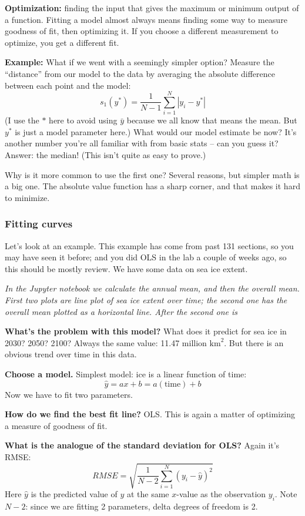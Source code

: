 \documentclass{article}
\begin{document}
\textbf{Optimization:} finding the input that gives the maximum or minimum output of a function. Fitting a model almost always means finding some way to measure goodness of fit, then optimizing it. If you choose a different measurement to optimize, you get a different fit.

\textbf{Example:} What if we went with a seemingly simpler option? Measure the ``distance'' from our model to the data by averaging the absolute difference between each point and the model:
\[
    s_1(y^*) = \frac{1}{N - 1} \sum_{i = 1}^N |y_i - y^*|
\]
(I use the $*$ here to avoid using $\bar y$ because we all know that means the mean. But $y^*$ is just a model parameter here.) What would our model estimate be now? It's another number you're all familiar with from basic stats -- can you guess it? Answer: the median! (This isn't quite as easy to prove.)

Why is it more common to use the first one? Several reasons, but simpler math is a big one. The absolute value function has a sharp corner, and that makes it hard to minimize.

\subsubsection{Fitting curves}

Let's look at an example. This example has come from past 131 sections, so you may have seen it before; and you did OLS in the lab a couple of weeks ago, so this should be mostly review. We have some data on sea ice extent.

\textit{In the Jupyter notebook we calculate the annual mean, and then the overall mean. First two plots are line plot of sea ice extent over time; the second one has the overall mean plotted as a horizontal line. After the second one is }

\textbf{What's the problem with this model?} What does it predict for sea ice in 2030? 2050? 2100? Always the same value: 11.47 million $\mathrm{km}^2$. But there is an obvious trend over time in this data.

\textbf{Choose a model.} Simplest model: ice is a linear function of time:
\[
\hat y = ax + b = a(\mathrm{time}) + b
\]
Now we have to fit two parameters.

\textbf{How do we find the best fit line?} OLS. This is again a matter of optimizing a measure of goodness of fit.

\textbf{What is the analogue of the standard deviation for OLS?} Again it's RMSE:
\[
    RMSE = \sqrt{\frac{1}{N-2} \sum_{i=1}^N (y_i - \hat y)^2}
\]
Here $\hat y$ is the predicted value of $y$ at the same $x$-value as the observation $y_i$. Note $N - 2$: since we are fitting 2 parameters, delta degrees of freedom is 2.
\end{document}
